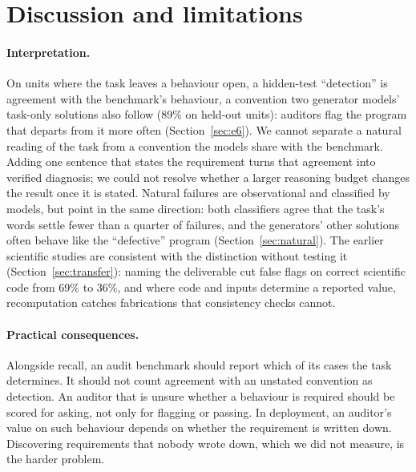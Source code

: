 \section{Discussion and limitations}
\label{sec:discussion}

\paragraph{Interpretation.} On units where the task leaves a behaviour open, a hidden-test ``detection'' is
agreement with the benchmark's behaviour, a convention two generator models' task-only solutions also follow (89\% on
held-out units): auditors flag the program that departs from it more often (Section~\ref{sec:e6}). We cannot
separate a natural reading of the task from a convention the models share with the benchmark.
Adding one sentence that states the requirement turns that agreement into verified diagnosis; we could not resolve
whether a larger reasoning budget changes the result once it is stated. Natural failures are observational and
classified by models, but point in the same direction: both classifiers agree that the task's words settle fewer than
a quarter of failures, and the generators' other solutions often behave like the ``defective'' program
(Section~\ref{sec:natural}). The earlier scientific studies are consistent with the distinction without testing it
(Section~\ref{sec:transfer}): naming the deliverable cut false flags on correct scientific code from 69\% to 36\%,
and where code and inputs determine a reported value, recomputation catches fabrications that consistency checks
cannot.

\paragraph{Practical consequences.} Alongside recall, an audit benchmark should report which of its cases the
task determines. It should not count agreement with an unstated convention as detection. An auditor that is
unsure whether a behaviour is required should be scored for asking, not only for flagging or passing.
In deployment, an auditor's value on such behaviour depends on whether the requirement is written down.
Discovering requirements that nobody wrote down, which we did not measure, is the harder problem.

